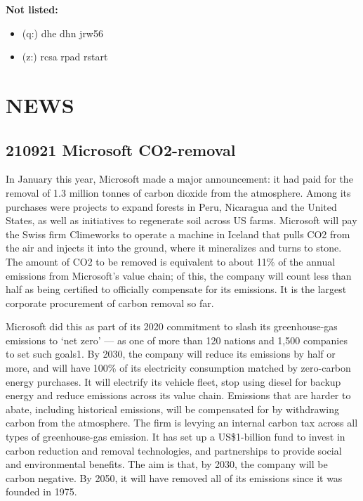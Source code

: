 \documentclass[
]{book}
\providecommand{\tightlist}{%
  \setlength{\itemsep}{0pt}\setlength{\parskip}{0pt}}
\begin{document}
\textbf{Not listed:}

\begin{itemize}
\tightlist
\item
  (q:) dhe dhn jrw56
\item
  (z:) rcsa rpad rstart
\end{itemize}

\hypertarget{news}{%
\chapter{NEWS}\label{news}}

\hypertarget{microsoft-co2-removal}{%
\section{210921 Microsoft CO2-removal}\label{microsoft-co2-removal}}

In January this year, Microsoft made a major announcement: it had paid for the removal of 1.3 million tonnes of carbon dioxide from the atmosphere. Among its purchases were projects to expand forests in Peru, Nicaragua and the United States, as well as initiatives to regenerate soil across US farms. Microsoft will pay the Swiss firm Climeworks to operate a machine in Iceland that pulls CO2 from the air and injects it into the ground, where it mineralizes and turns to stone. The amount of CO2 to be removed is equivalent to about 11\% of the annual emissions from Microsoft's value chain; of this, the company will count less than half as being certified to officially compensate for its emissions. It is the largest corporate procurement of carbon removal so far.

Microsoft did this as part of its 2020 commitment to slash its greenhouse-gas emissions to `net zero' --- as one of more than 120 nations and 1,500 companies to set such goals1. By 2030, the company will reduce its emissions by half or more, and will have 100\% of its electricity consumption matched by zero-carbon energy purchases. It will electrify its vehicle fleet, stop using diesel for backup energy and reduce emissions across its value chain. Emissions that are harder to abate, including historical emissions, will be compensated for by withdrawing carbon from the atmosphere. The firm is levying an internal carbon tax across all types of greenhouse-gas emission. It has set up a US\$1-billion fund to invest in carbon reduction and removal technologies, and partnerships to provide social and environmental benefits. The aim is that, by 2030, the company will be carbon negative. By 2050, it will have removed all of its emissions since it was founded in 1975.
\end{document}
